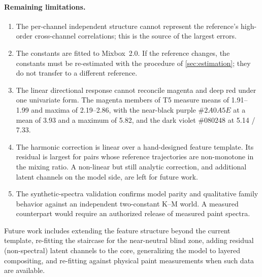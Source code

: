 \paragraph{Remaining limitations.}
\begin{enumerate}
\item The per-channel independent structure cannot represent the reference's high-order cross-channel correlations; this is the source of the largest errors.
\item The constants are fitted to Mixbox~2.0. If the reference changes, the constants must be re-estimated with the procedure of \cref{sec:estimation}; they do not transfer to a different reference.
\item The linear directional response cannot reconcile magenta and deep red under one univariate form. The magenta members of T5 measure means of 1.91--1.99 and maxima of 2.19--2.86, with the near-black purple $\#2A0A5E$ at a mean of 3.93 and a maximum of 5.82, and the dark violet $\#080248$ at 5.14 / 7.33.
\item The harmonic correction is linear over a hand-designed feature template. Its residual is largest for pairs whose reference trajectories are non-monotone in the mixing ratio. A non-linear but still analytic correction, and additional latent channels on the model side, are left for future work.
\item The synthetic-spectra validation confirms model parity and qualitative family behavior against an independent two-constant K--M world. A measured counterpart would require an authorized release of measured paint spectra.
\end{enumerate}

Future work includes extending the feature structure beyond the current template, re-fitting the staircase for the near-neutral blind zone, adding residual (non-spectral) latent channels to the core, generalizing the model to layered compositing, and re-fitting against physical paint measurements when such data are available.
